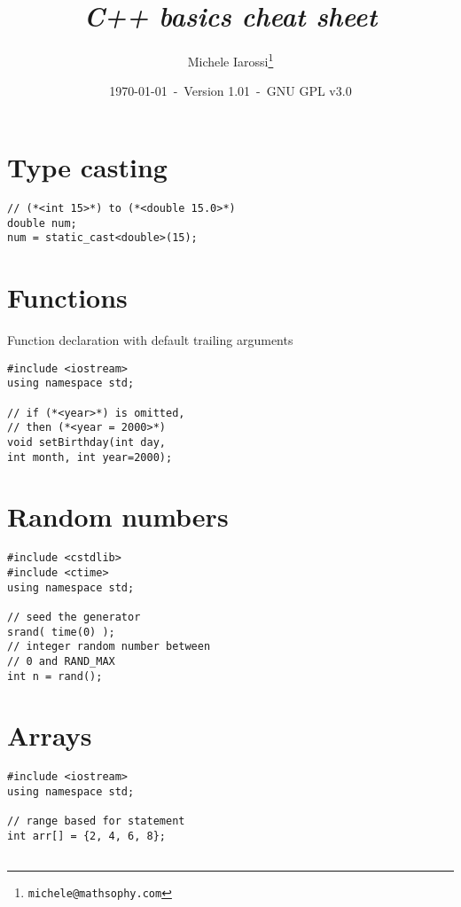 \documentclass[10pt]{article}
\begin{document}
\title{\emph{C++ basics cheat sheet}}
\author{Michele Iarossi\thanks{\texttt{michele@mathsophy.com}}}
\date{\small \today~-~Version 1.01~-~GNU GPL v3.0}


\maketitle

\begin{multicols*}{3}
%
%
\section*{Type casting}
\small
\lstset {language=C++}
\begin{lstlisting}
// (*<int 15>*) to (*<double 15.0>*)
double num;
num = static_cast<double>(15);
\end{lstlisting}
%
%
\section*{Functions}
\small
Function declaration with
default trailing arguments
\lstset {language=C++}
\begin{lstlisting}
#include <iostream>
using namespace std;

// if (*<year>*) is omitted, 
// then (*<year = 2000>*)
void setBirthday(int day,
int month, int year=2000);
\end{lstlisting}
%
%
\section*{Random numbers}
\small
\lstset {language=C++}
\begin{lstlisting}
#include <cstdlib>
#include <ctime>
using namespace std;

// seed the generator
srand( time(0) );
// integer random number between
// 0 and RAND_MAX
int n = rand();
\end{lstlisting}
%
%
\section*{Arrays}
\small
\lstset {language=C++}
\begin{lstlisting}
#include <iostream>
using namespace std;

// range based for statement
int arr[] = {2, 4, 6, 8};


\end{lstlisting}
\end{multicols*}
\end{document}
